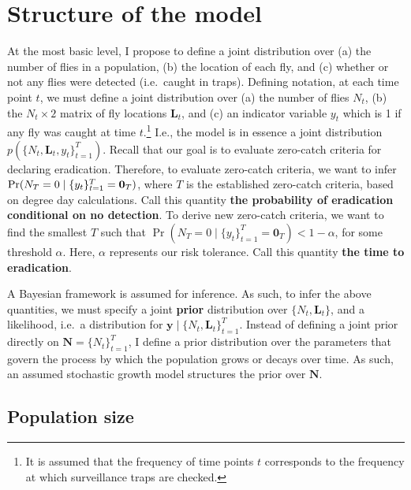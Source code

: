 \documentclass[
  oneside]{book}
\begin{document}
\hypertarget{structure-of-the-model}{%
\section{Structure of the model}\label{structure-of-the-model}}

At the most basic level, I propose to define a joint distribution over (a) the number of flies in a population, (b) the location of each fly, and (c) whether or not any flies were detected (i.e.~caught in traps). Defining notation, at each time point \(t\), we must define a joint distribution over (a) the number of flies \(N_t\), (b) the \(N_t \times 2\) matrix of fly locations \(\mathbf L_t\), and (c) an indicator variable \(y_t\) which is 1 if any fly was caught at time \(t\).\footnote{It is assumed that the frequency of time points \(t\) corresponds to the frequency at which surveillance traps are checked.} I.e., the model is in essence a joint distribution \(p(\{N_t, \mathbf L_t, y_t\}_{t=1}^T)\). Recall that our goal is to evaluate zero-catch criteria for declaring eradication. Therefore, to evaluate zero-catch criteria, we want to infer \(\Pr(N_T = 0 \mid \mathbf \{y_t\}_{t=1}^T = \mathbf 0_T)\), where \(T\) is the established zero-catch criteria, based on degree day calculations. Call this quantity \textbf{the probability of eradication conditional on no detection}. To derive new zero-catch criteria, we want to find the smallest \(T\) such that \(\Pr(N_T = 0 \mid \{y_t\}_{t=1}^T = \mathbf 0_T) < 1-\alpha\), for some threshold \(\alpha\). Here, \(\alpha\) represents our risk tolerance. Call this quantity \textbf{the time to eradication}.

A Bayesian framework is assumed for inference. As such, to infer the above quantities, we must specify a joint \textbf{prior} distribution over \(\{N_t, \mathbf L_t\}\), and a likelihood, i.e.~a distribution for \(\mathbf y \mid \{N_t, \mathbf L_t\}_{t=1}^T\). Instead of defining a joint prior directly on \(\mathbf N = \{N_t\}_{t=1}^T\), I define a prior distribution over the parameters that govern the process by which the population grows or decays over time. As such, an assumed stochastic growth model structures the prior over \(\mathbf N\).

\hypertarget{population-size}{%
\subsection{Population size}\label{population-size}}
\end{document}
